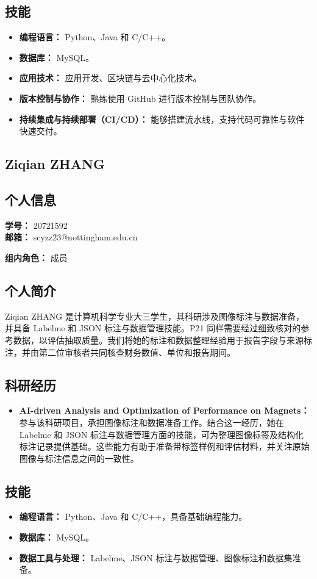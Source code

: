 \documentclass[a4paper,12pt]{article}
\newcommand{\PersonalInformation}[2]{%
  \subsection*{个人信息}
  \if\relax\detokenize{#1}\relax\else
  \noindent\textbf{学号：} #1\\
  \fi
  \textbf{邮箱：} #2\par
}
\begin{document}
\subsection*{技能}
\begin{itemize}
  \item \textbf{编程语言：} Python、Java 和 C/C++。
  \item \textbf{数据库：} MySQL。
  \item \textbf{应用技术：} 应用开发、区块链与去中心化技术。
  \item \textbf{版本控制与协作：} 熟练使用 GitHub 进行版本控制与团队协作。
  \item \textbf{持续集成与持续部署（CI/CD）：} 能够搭建流水线，支持代码可靠性与软件快速交付。
\end{itemize}

\subsection{Ziqian ZHANG}
\PersonalInformation{20721592}{scyzz23@nottingham.edu.cn}
\noindent\textbf{组内角色：} 成员\par

\subsection*{个人简介}
Ziqian ZHANG 是计算机科学专业大三学生，其科研涉及图像标注与数据准备，并具备 Labelme 和 JSON 标注与数据管理技能。P21 同样需要经过细致核对的参考数据，以评估抽取质量。我们将她的标注和数据整理经验用于报告字段与来源标注，并由第二位审核者共同核查财务数值、单位和报告期间。

\subsection*{科研经历}
\begin{itemize}
  \item \textbf{AI-driven Analysis and Optimization of Performance on Magnets：} 参与该科研项目，承担图像标注和数据准备工作。结合这一经历，她在 Labelme 和 JSON 标注与数据管理方面的技能，可为整理图像标签及结构化标注记录提供基础。这些能力有助于准备带标签样例和评估材料，并关注原始图像与标注信息之间的一致性。
\end{itemize}

\subsection*{技能}
\begin{itemize}
  \item \textbf{编程语言：} Python、Java 和 C/C++，具备基础编程能力。
  \item \textbf{数据库：} MySQL。
  \item \textbf{数据工具与处理：} Labelme、JSON 标注与数据管理、图像标注和数据集准备。
\end{itemize}
\end{document}
